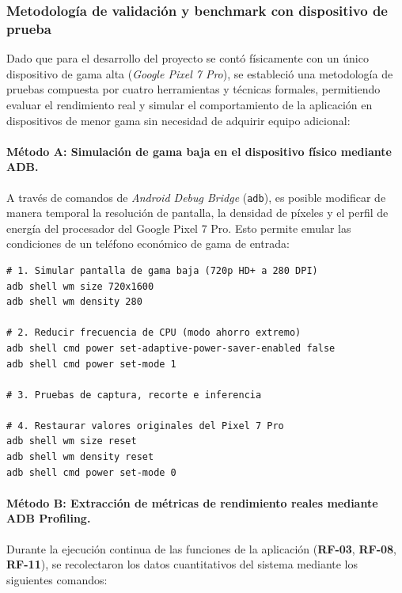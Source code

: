 \subsubsection{Metodología de validación y benchmark con dispositivo de prueba}
\label{subsubsec:metodologia-benchmark}

Dado que para el desarrollo del proyecto se contó físicamente con un único dispositivo de gama alta (\textit{Google Pixel 7 Pro}), se estableció una metodología de pruebas compuesta por cuatro herramientas y técnicas formales, permitiendo evaluar el rendimiento real y simular el comportamiento de la aplicación en dispositivos de menor gama sin necesidad de adquirir equipo adicional:

\paragraph{Método A: Simulación de gama baja en el dispositivo físico mediante ADB.}
A través de comandos de \textit{Android Debug Bridge} (\texttt{adb}), es posible modificar de manera temporal la resolución de pantalla, la densidad de píxeles y el perfil de energía del procesador del Google Pixel 7 Pro. Esto permite emular las condiciones de un teléfono económico de gama de entrada:

\begin{verbatim}
# 1. Simular pantalla de gama baja (720p HD+ a 280 DPI)
adb shell wm size 720x1600
adb shell wm density 280

# 2. Reducir frecuencia de CPU (modo ahorro extremo)
adb shell cmd power set-adaptive-power-saver-enabled false
adb shell cmd power set-mode 1

# 3. Pruebas de captura, recorte e inferencia

# 4. Restaurar valores originales del Pixel 7 Pro
adb shell wm size reset
adb shell wm density reset
adb shell cmd power set-mode 0
\end{verbatim}

\paragraph{Método B: Extracción de métricas de rendimiento reales mediante ADB Profiling.}
Durante la ejecución continua de las funciones de la aplicación (\textbf{RF-03}, \textbf{RF-08}, \textbf{RF-11}), se recolectaron los datos cuantitativos del sistema mediante los siguientes comandos:

